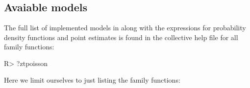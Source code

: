 \documentclass[
]{jss}
\newcommand{\1}{\mathcal{I}} \newcommand{\bx}{\boldsymbol{x}}
\begin{document}
\subsection{Avaiable models}\label{avaiable-models}

The full list of implemented models in  along with
the expressions for probability density functions and point estimates is
found in the collective help file for all family functions:

\begin{CodeChunk}
\begin{CodeInput}
R> ?ztpoisson
\end{CodeInput}
\end{CodeChunk}

Here we limit ourselves to just listing the family functions:
\end{document}
